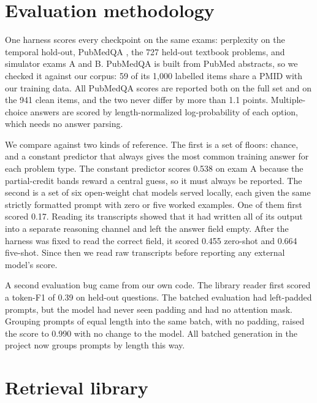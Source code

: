 \documentclass[11pt]{article}
\begin{document}
\section{Evaluation methodology}
\label{sec:eval}

One harness scores every checkpoint on the same exams: perplexity on the
temporal hold-out, PubMedQA \citep{jin2019pubmedqa}, the 727 held-out
textbook problems, and simulator exams A and B. PubMedQA is built from
PubMed abstracts, so we checked it against our corpus: 59 of its 1,000
labelled items share a PMID with our training data. All PubMedQA scores
are reported both on the full set and on the 941 clean items, and the two never differ by more than 1.1
points. Multiple-choice answers are scored by length-normalized
log-probability of each option, which needs no answer parsing.

We compare against two kinds of reference. The first is a set of floors: chance, and
a constant predictor that always gives the most common training answer
for each problem type. The constant predictor scores 0.538 on exam A
because the partial-credit bands reward a central guess, so it must always
be reported. The second is a set of six open-weight chat models served locally, each
given the same strictly formatted prompt with zero or five worked examples.
One of them first scored 0.17. Reading its transcripts showed that it had
written all of its output into a separate reasoning channel and left the
answer field empty. After the harness was fixed to read the correct field,
it scored 0.455 zero-shot and 0.664 five-shot. Since then we read raw
transcripts before reporting any external model's score.

A second evaluation bug came from our own code. The library reader first
scored a token-F1 of 0.39 on held-out questions. The batched evaluation
had left-padded prompts, but the model had never seen padding and had no
attention mask. Grouping prompts of equal length into the same batch, with no padding, raised the
score to 0.990 with no change to the model. All batched generation in the
project now groups prompts by length this way.

\section{Retrieval library}
\end{document}
